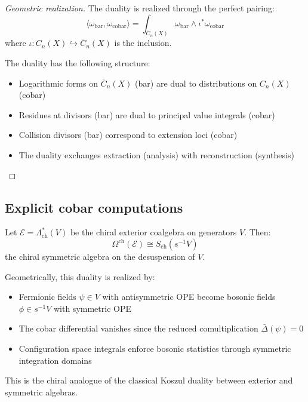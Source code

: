 \begin{proof}[Geometric realization]
The duality is realized through the perfect pairing:
\[
\langle \omega_{\text{bar}}, \omega_{\text{cobar}} \rangle = \int_{\overline{C}_n(X)} \omega_{\text{bar}} \wedge \iota^*\omega_{\text{cobar}}
\]
where $\iota: C_n(X) \hookrightarrow \overline{C}_n(X)$ is the inclusion.

The duality has the following structure:
\begin{itemize}
\item Logarithmic forms on $\overline{C}_n(X)$ (bar) are dual to distributions on $C_n(X)$ (cobar)
\item Residues at divisors (bar) are dual to principal value integrals (cobar)
\item Collision divisors (bar) correspond to extension loci (cobar)
\item The duality exchanges extraction (analysis) with reconstruction (synthesis)
\end{itemize}
\end{proof}

\subsection{Explicit cobar computations}

\begin{example}\label{ex:cobar-exterior}
Let $\mathcal{E} = \Lambda^*_{\text{ch}}(V)$ be the chiral exterior coalgebra on generators $V$. Then:
\[
\Omega^{\text{ch}}(\mathcal{E}) \cong S_{\text{ch}}(s^{-1}V)
\]
the chiral symmetric algebra on the desuspension of $V$. 

Geometrically, this duality is realized by:
\begin{itemize}
\item Fermionic fields $\psi \in V$ with antisymmetric OPE become bosonic fields $\phi \in s^{-1}V$ with symmetric OPE
\item The cobar differential vanishes since the reduced comultiplication $\bar{\Delta}(\psi) = 0$
\item Configuration space integrals enforce bosonic statistics through symmetric integration domains
\end{itemize}

This is the chiral analogue of the classical Koszul duality between exterior and symmetric algebras.
\end{example}

